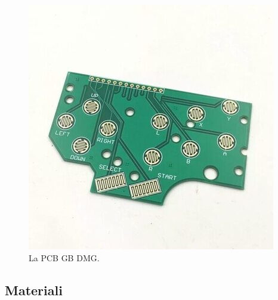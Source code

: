 \documentclass[hidelinks,12pt]{article}
\begin{document}
\begin{figure}[h]
	\begin{center}
		\includegraphics[scale=0.4]{figures/pcb.jpeg}
	\end{center}
	\caption{La PCB GB DMG.}
	\label{fig:pcb}
\end{figure}

\subsection{Materiali}
\end{document}
